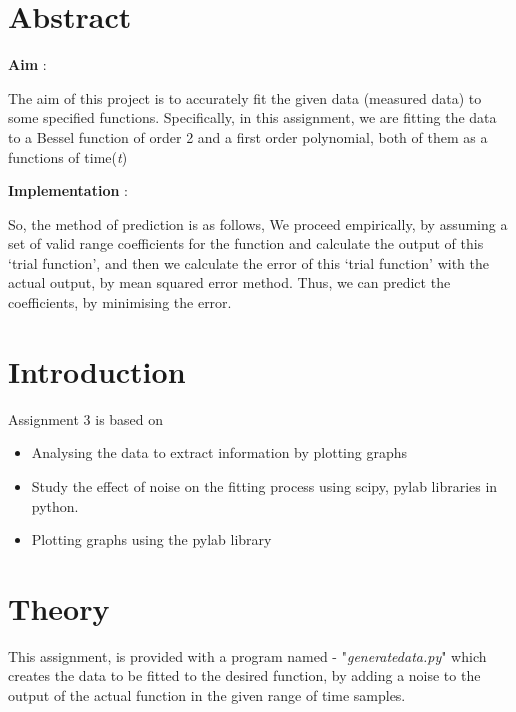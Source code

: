 \documentclass[10pt,english, openany]{book}
\begin{document}
\tableofcontents{}

\mainmatter

\chapter{Abstract}\label{chapt:sum}
	\vspace{0.5cm}
	\large \textbf{Aim} : \par The aim of this project is to accurately fit the given data (measured data) to some specified functions. Specifically, in this assignment, we are fitting the data to a Bessel function of order 2 and a first order polynomial, both of them as a functions of time(\textit{t})\par
    \vspace{1cm}
   
    \large \textbf{Implementation} :  \par 
So, the method of prediction is as follows,
We proceed empirically, by assuming a set of valid range coefficients for the function and calculate the output of this ‘trial function’, and then we calculate the error of this ‘trial function’ with the actual output, by mean squared error method. Thus, we can predict the coefficients, by minimising the error.\par
\begingroup
\let\clearpage\relax
\chapter{Introduction}
Assignment 3 is based on
\begin{itemize}
\item Analysing the data to extract information by plotting graphs
\item Study the effect of noise on the fitting process using scipy, pylab libraries in python.
\item Plotting graphs using the pylab library
\end{itemize}

\endgroup
\chapter{Theory}
\vspace{0.5cm}
This assignment, is provided with a program named - "\textit{generatedata.py}" which creates the data to be fitted to the desired function, by adding a noise to the output of the actual function in the given range of time samples.\par
\vspace{0.2cm}
\end{document}
